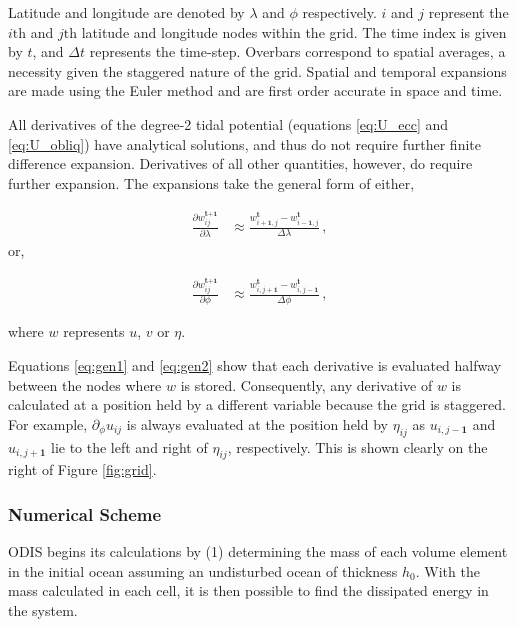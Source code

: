 Latitude and longitude are denoted by $\lambda$ and $\phi$ respectively. $i$ and $j$ represent the $i\text{th}$ and $j\text{th}$ latitude and longitude nodes within the grid. The time index is given by $t$, and $\Delta t$ represents the time-step. Overbars correspond to spatial averages, a necessity given the staggered nature of the grid. Spatial and temporal expansions are made using the Euler method and are first order accurate in space and time.

All derivatives of the degree-2 tidal potential (equations \ref{eq:U_ecc} and \ref{eq:U_obliq}) have analytical solutions, and thus do not require further finite difference expansion. Derivatives of all other quantities, however, do require further expansion. The expansions take the general form of either,

\begin{align}
\frac{\partial w_{ij}^{\textbf{t+1}}}{\partial \lambda} &\approx \frac{w_{i+\textbf{1},j}^{\textbf{t}} - w_{i-\textbf{1},j}^{\textbf{t}}}{\Delta \lambda} \, , \label{eq:gen1}
\end{align} or,

\begin{align}
\frac{\partial w_{ij}^{\textbf{t+1}}}{\partial \phi} &\approx \frac{w_{i,j+\textbf{1}}^{\textbf{t}} - w_{i,j-\textbf{1}}^{\textbf{t}}}{\Delta \phi} \, , \label{eq:gen2}
\end{align}

\noindent where $w$ represents $u$, $v$ or $\eta$.

Equations \ref{eq:gen1} and \ref{eq:gen2} show that each derivative is evaluated halfway between the nodes where $w$ is stored. Consequently, any derivative of $w$ is calculated at a position held by a different variable because the grid is staggered. For example, $\partial_\phi u_{ij}$ is always evaluated at the position held by $\eta_{ij}$ as $u_{i,j-\textbf{1}}$ and $u_{i,j+\textbf{1}}$ lie to the left and right of $\eta_{ij}$,  respectively. This is shown clearly on the right of Figure \ref{fig:grid}.

\subsubsection{Numerical Scheme}

ODIS begins its calculations by (1) determining the mass of each volume element in the initial ocean assuming an undisturbed ocean of thickness $h_0$. With the mass calculated in each cell, it is then possible to find the dissipated energy in the system.

